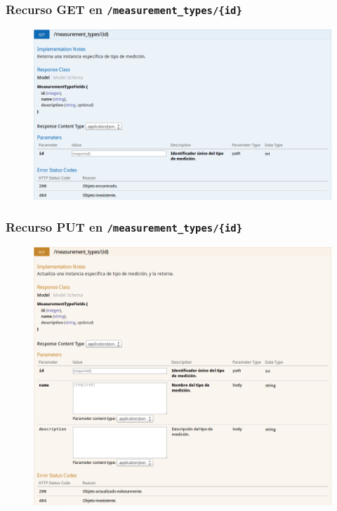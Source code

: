 \newpage


\subsubsection{Recurso GET en \texttt{/measurement\_types/\{id\}}}

\begin{figure}[h]
  \centering
  \includegraphics[width=\textwidth,height=.75\textheight,keepaspectratio]{img/especificacion_api/measurementTypeView_get}
  \label{measurementTypeView_get}
\end{figure}

\newpage


\subsubsection{Recurso PUT en \texttt{/measurement\_types/\{id\}}}

\begin{figure}[h]
  \centering
  \includegraphics[width=\textwidth,height=.75\textheight,keepaspectratio]{img/especificacion_api/measurementTypeView_put}
  \label{measurementTypeView_put}
\end{figure}

